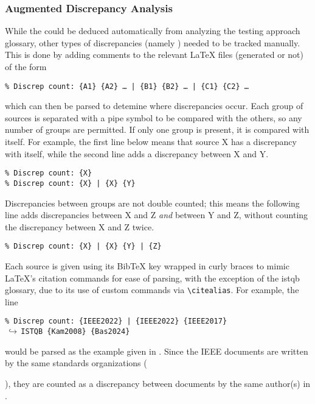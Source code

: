 \subsubsection{Augmented Discrepancy Analysis}
\label{aug-discrep-analysis}
While the \autoDiscreps{} could be deduced automatically from analyzing the
testing approach glossary, other types of discrepancies (namely
) needed to be tracked manually. This is done by adding
comments to the relevant \LaTeX{} files (generated or not) of the form
\begin{displayquote}
    \texttt{\% Discrep count: \{A1\} \{A2\} \dots{} | \{B1\} \{B2\} \dots{} |
        \{C1\} \{C2\} \dots}
\end{displayquote}
which can then be parsed to detemine where discrepancies occur. Each group of
sources is separated with a pipe symbol to be compared with the others, so any
number of groups are permitted. If only one group is present, it is compared
with itself. For example, the first line below means that source X has a
discrepancy with itself, while the second line adds a discrepancy between X and Y.
\begin{displayquote}
    \texttt{\% Discrep count: \{X\}\\\% Discrep count: \{X\} | \{X\} \{Y\}}
\end{displayquote}
Discrepancies between groups are not double counted; this means the following
line adds discrepancies between X and Z \emph{and} between Y and Z, without
counting the discrepancy between X and Z twice.
\begin{displayquote}
    \texttt{\% Discrep count: \{X\} | \{X\} \{Y\} | \{Z\}}
\end{displayquote}
Each source is given using its BibTeX key wrapped in curly braces to mimic
\LaTeX{}'s citation commands for ease of parsing, with the exception of the
\acs{istqb} glossary, due to its use of custom commands via
\texttt{\textbackslash citealias}. For example, the line
\begin{displayquote}
    \texttt{\% Discrep count: \{IEEE2022\} | \{IEEE2022\} \{IEEE2017\}\\
        $\,\hookrightarrow\,$\quad ISTQB \{Kam2008\} \{Bas2024\}}
\end{displayquote}
would be parsed as the example given in . Since
the IEEE documents are written by the same standards organizations
(\begin{NoHyper}\citeauthor{IEEE2022}\end{NoHyper}), they are counted as a
discrepancy between documents by the same author(s) in .


